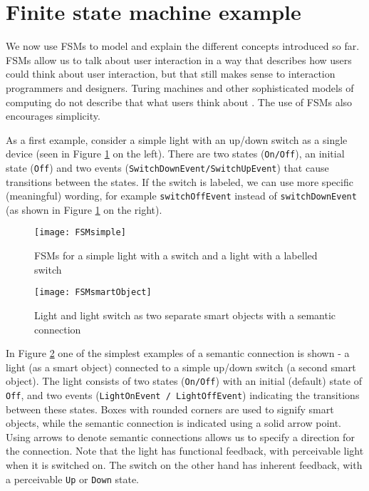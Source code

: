 



\section{Finite state machine example}

We now use \acp{FSM} to model and explain the different concepts introduced so far. \acp{FSM} allow us to talk about user interaction in a way that describes how users could think about user interaction, but that still makes sense to interaction programmers and designers. Turing machines and other sophisticated models of computing do not describe that what users think about \cite{Thimbleby2007}. The use of \acp{FSM} also encourages simplicity.

As a first example, consider a simple light with an up/down switch as a single device (seen in Figure \ref{FSMsimple} on the left). There are two states (\texttt{On/Off}), an initial state (\texttt{Off}) and two events (\texttt{Switch\-Down\-Event/Switch\-Up\-Event}) that cause transitions between the states. If the switch is labeled, we can use more specific (meaningful) wording, for example \texttt{switch\-Off\-Event} instead of \texttt{switchDownEvent} (as shown in Figure \ref{FSMsimple} on the right). %

\begin{figure}
\centerline{\texttt{[image: FSMsimple]}}
\caption{FSMs for a simple light with a switch and a light with a labelled switch}
\label{FSMsimple}
\end{figure}

\begin{figure}
\centerline{\texttt{[image: FSMsmartObject]}}
\caption{Light and light switch as two separate smart objects with a semantic connection}
\label{FSMsmartObject}
\end{figure}

In Figure \ref{FSMsmartObject} one of the simplest examples of a semantic connection is shown - a light (as a smart object) connected to a simple up/down switch (a second smart object). The light consists of two states (\texttt{On/Off}) with an initial (default) state of \texttt{Off}, and two events (\texttt{Light\-On\-Event / Light\-Off\-Event}) indicating the transitions between these states. Boxes with rounded corners are used to signify smart objects, while the semantic connection is indicated using a solid arrow point. Using arrows to denote semantic connections allows us to specify a direction for the connection.  Note that the light has functional feedback, with perceivable light when it is switched on. The switch on the other hand has inherent feedback, with a perceivable \texttt{Up} or \texttt{Down} state.  

